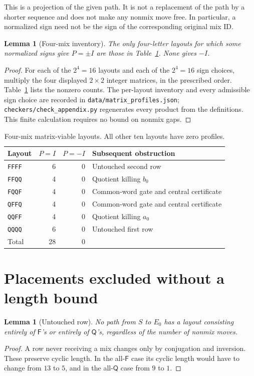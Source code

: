 \documentclass[11pt,a4paper]{article}
\newtheorem{lemma}[theorem]{Lemma}
\theoremstyle{definition}\newtheorem{definition}[theorem]{Definition}
\theoremstyle{remark}\newtheorem{remark}[theorem]{Remark}
\newcommand{\F}{\mathsf F}
\newcommand{\Q}{\mathsf Q}
\newcommand{\word}[1]{\texttt{#1}}
\newcommand{\pathfile}[1]{\nolinkurl{#1}}
\begin{document}
This is a projection of the given path. It is not a replacement of the path by a shorter sequence and does not make any nonmix move free. In particular, a normalized sign need not be the sign of the corresponding original mix ID.

\begin{lemma}[Four-mix inventory]\label{lem:fourmatrix}
The only four-letter layouts for which some normalized signs give $P=\pm I$ are those in Table~\ref{tab:four}. None gives $-I$.
\end{lemma}
\begin{proof}
For each of the $2^4=16$ layouts and each of the $2^4=16$ sign choices, multiply the four displayed $2\times2$ integer matrices, in the prescribed order. Table~\ref{tab:four} lists the nonzero counts. The per-layout inventory and every admissible sign choice are recorded in \pathfile{data/matrix_profiles.json}; \pathfile{checkers/check_appendix.py} regenerates every product from the definitions. This finite calculation requires no bound on nonmix gaps.
\end{proof}

\begin{table}[H]\centering
\caption{Four-mix matrix-viable layouts. All other ten layouts have zero profiles.}\label{tab:four}
\begin{tabular}{lrrl}\toprule
Layout & $P=I$ & $P=-I$ & Subsequent obstruction\\\midrule
\word{FFFF} &6&0& Untouched second row\\
\word{FFQQ} &4&0& Quotient killing $b_0$\\
\word{FQQF} &4&0& Common-word gate and central certificate\\
\word{QFFQ} &4&0& Common-word gate and central certificate\\
\word{QQFF} &4&0& Quotient killing $a_0$\\
\word{QQQQ} &6&0& Untouched first row\\\midrule
Total &28&0&\\\bottomrule
\end{tabular}
\end{table}

\section{Placements excluded without a length bound}\label{sec:quotients}
\begin{lemma}[Untouched row]\label{lem:untouched}
No path from $S$ to $E_0$ has a layout consisting entirely of $\F$'s or entirely of $\Q$'s, regardless of the number of nonmix moves.
\end{lemma}
\begin{proof}
A row never receiving a mix changes only by conjugation and inversion. These preserve cyclic length. In the all-$\F$ case its cyclic length would have to change from $13$ to $5$, and in the all-$\Q$ case from $9$ to $1$.
\end{proof}
\end{document}
